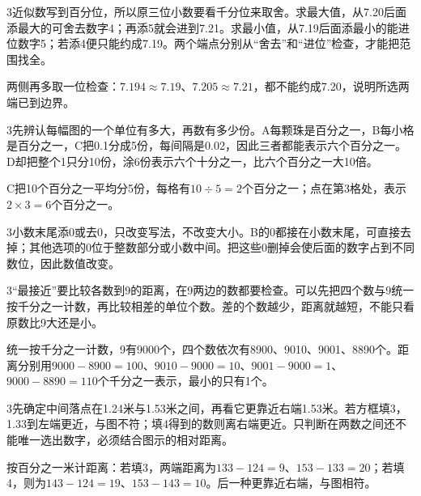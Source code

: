 \documentclass[multi=snippet,border={5bp 20bp 5bp 5bp}]{standalone}
\newenvironment{snippet}[3]{\begin{minipage}{#1bp}\color{answerred}\fontsize{#2}{#3}\selectfont\raggedright}{\end{minipage}}
\begin{document}
\begin{snippet}{505}{11.5}{14}\begin{multicols}{3}\raggedcolumns 近似数写到百分位，所以原三位小数要看千分位来取舍。求最大值，从7.20后面添最大的可舍去数字4；再添5就会进到7.21。求最小值，从7.19后面添最小的能进位数字5；若添4便只能约成7.19。两个端点分别从“舍去”和“进位”检查，才能把范围找全。\par 两侧再多取一位检查：\(7.194\approx7.19\)\allowbreak 、\(7.205\approx7.21\)\allowbreak ，都不能约成7.20，说明所选两端已到边界。\end{multicols}\end{snippet}
\begin{snippet}{505}{11.5}{14}\begin{multicols}{3}\raggedcolumns 先辨认每幅图的一个单位有多大，再数有多少份。A每颗珠是百分之一，B每小格是百分之一，C把0.1分成5份，每间隔是0.02，因此三者都能表示六个百分之一。D却把整个1只分10份，涂6份表示六个十分之一，比六个百分之一大10倍。\par C把10个百分之一平均分5份，每格有\(10\div5=2\)\allowbreak 个百分之一；点在第3格处，表示\(2\times3=6\)\allowbreak 个百分之一。\end{multicols}\end{snippet}
\begin{snippet}{505}{11.5}{14}\begin{multicols}{3}\raggedcolumns 小数末尾添0或去0，只改变写法，不改变大小。B的0都接在小数末尾，可直接去掉；其他选项的0位于整数部分或小数中间。把这些0删掉会使后面的数字占到不同数位，因此数值改变。\end{multicols}\end{snippet}
\begin{snippet}{505}{11.5}{14}\begin{multicols}{3}\raggedcolumns “最接近”要比较各数到9的距离，在9两边的数都要检查。可以先把四个数与9统一按千分之一计数，再比较相差的单位个数。差的个数越少，距离就越短，不能只看原数比9大还是小。\par 统一按千分之一计数，9有9000个，四个数依次有8900、9010、9001、8890个。距离分别用\(9000-8900=100\)\allowbreak 、\(9010-9000=10\)\allowbreak 、\(9001-9000=1\)\allowbreak 、\(9000-8890=110\)\allowbreak 个千分之一表示，最小的只有1个。\end{multicols}\end{snippet}
\begin{snippet}{505}{11.5}{14}\begin{multicols}{3}\raggedcolumns 先确定中间落点在1.24米与1.53米之间，再看它更靠近右端1.53米。若方框填3，1.33到左端更近，与图不符；填4得到的数则离右端更近。只判断在两数之间还不能唯一选出数字，必须结合图示的相对距离。\par 按百分之一米计距离：若填3，两端距离为\(133-124=9\)\allowbreak 、\(153-133=20\)\allowbreak ；若填4，则为\(143-124=19\)\allowbreak 、\(153-143=10\)\allowbreak 。后一种更靠近右端，与图相符。\end{multicols}\end{snippet}
\end{document}
